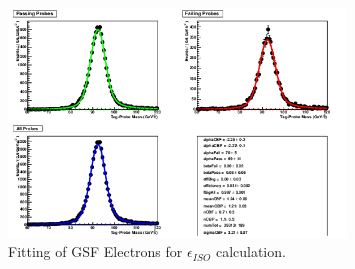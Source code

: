 \begin{figure}[htb]
\centering
\includegraphics[width=0.8\textwidth]{Systematics/2012data_outputGsfElectronToId.png}
\caption{Fitting of GSF Electrons for $\epsilon_{ISO}$ calculation.}
\label{fig:2012data_outputGsfElectronToId}
\end{figure}




